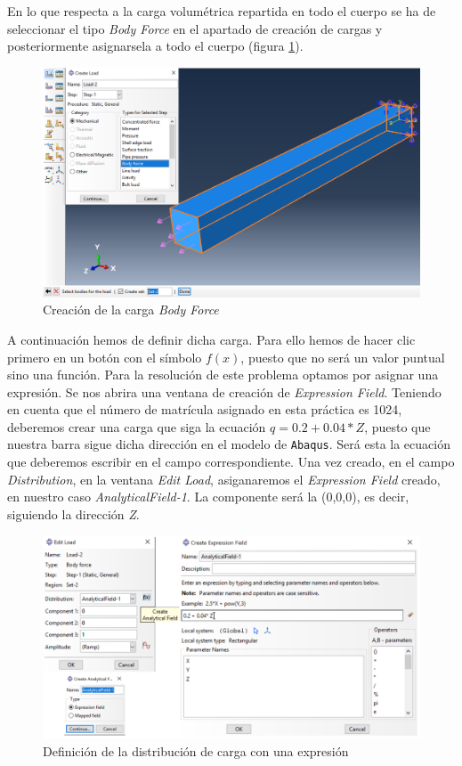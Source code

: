 \documentclass[spanish,a4paper,12pt]{article}
\begin{document}
En lo que respecta a la carga volumétrica repartida en todo el cuerpo se ha de seleccionar el tipo \emph{Body Force} en el apartado de creación de cargas y posteriormente asignarsela a todo el cuerpo (figura \ref{fig:load4}).

\begin{figure}[h!tp]
\centering
\includegraphics[scale=0.35]{capturas/load6.png}
\caption{Creación de la carga \emph{Body Force}}
\label{fig:load4}
\end{figure}

A continuación hemos de definir dicha carga. Para ello hemos de hacer clic primero en un botón con el símbolo $f(x)$, puesto que no será un valor puntual sino una función. Para la resolución de este problema optamos por asignar una expresión. Se nos abrira una ventana de creación de \emph{Expression Field}. Teniendo en cuenta que el número de  matrícula asignado en esta práctica es 1024, deberemos crear una carga que siga la ecuación $q=0.2 + 0.04*Z$, puesto que nuestra barra sigue dicha dirección en el modelo de \texttt{Abaqus}. Será esta la ecuación que deberemos escribir en el campo correspondiente. Una vez creado, en el campo \emph{Distribution}, en la ventana \emph{Edit Load}, asiganaremos el \emph{Expression Field} creado, en nuestro caso \emph{AnalyticalField-1}. La componente será la (0,0,0), es decir, siguiendo la dirección \emph{Z}.

\clearpage
\begin{figure}[h!tp]
\centering
\includegraphics[scale=0.85]{capturas/load7.png}
\caption{Definición de la distribución de carga con una expresión}
\label{fig:load5}
\end{figure}
\end{document}
